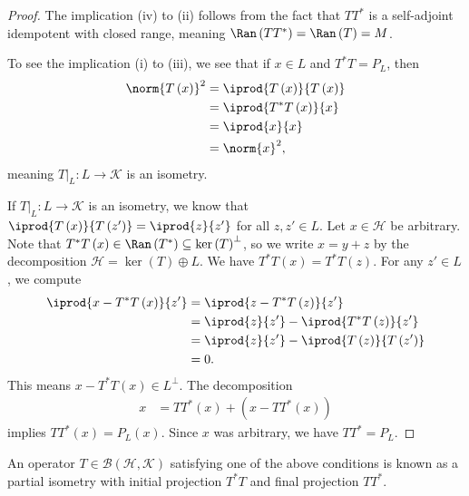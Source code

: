 \documentclass[10pt]{mypackage}
\begin{document}
\begin{proof}
  The implication (iv) to (ii) follows from the fact that $TT^{\ast}$ is a self-adjoint idempotent with closed range, meaning $\Ran\left(TT^{\ast}\right) = \Ran\left(T\right) = M$.\newline

  To see the implication (i) to (iii), we see that if $x\in L$ and $T^{\ast}T = P_{L}$, then
  \begin{align*}
    \norm{T\left(x\right)}^2 &= \iprod{T\left(x\right)}{T\left(x\right)}\\
                             &= \iprod{T^{\ast}T\left(x\right)}{x}\\
                             &= \iprod{x}{x}\\
                             &= \norm{x}^2,
  \end{align*}
  meaning $T|_{L}:L\rightarrow\mathcal{K}$ is an isometry.\newline

  If $T|_{L}:L\rightarrow \mathcal{K}$ is an isometry, we know that $ \iprod{T\left(x\right)}{T\left(z'\right)} = \iprod{z}{z'} $ for all $z,z'\in L$. Let $x\in \mathcal{H}$ be arbitrary. Note that $T^{\ast}T\left(x\right)\in \Ran\left(T^{\ast}\right)\subseteq \ker\left(T\right)^{\perp}$, so we write $x = y +z$ by the decomposition $\mathcal{H} = \ker\left(T\right) \oplus L$. We have $T^{\ast}T\left(x\right) = T^{\ast}T\left(z\right)$. For any $z'\in L$, we compute
  \begin{align*}
    \iprod{x - T^{\ast}T\left(x\right)}{z'} &= \iprod{z - T^{\ast}T\left(z\right)}{z'}\\
                                            &= \iprod{z}{z'} - \iprod{T^{\ast}T\left(z\right)}{z'}\\
                                            &= \iprod{z}{z'} - \iprod{T\left(z\right)}{T\left(z'\right)}\\
                                            &= 0.
  \end{align*}
  This means $x-T^{\ast}T\left(x\right) \in L^{\perp}$. The decomposition
  \begin{align*}
    x &= TT^{\ast}\left(x\right) + \left(x - TT^{\ast}\left(x\right)\right)
  \end{align*}
  implies $TT^{\ast}\left(x\right) = P_{L}\left(x\right)$. Since $x$ was arbitrary, we have $TT^{\ast} = P_{L}$.
\end{proof}
\begin{definition}
  An operator $T\in \mathcal{B}\left(\mathcal{H},\mathcal{K}\right)$ satisfying one of the above conditions is known as a partial isometry with initial projection $T^{\ast}T$ and final projection $TT^{\ast}$.
\end{definition}
\end{document}
